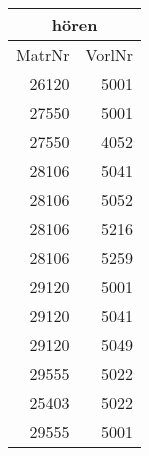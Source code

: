 \begin{tabular}[t]{|r|r|}
  \hline
  \multicolumn{2}{|c|}{hören}\\
  \hline
  MatrNr & VorlNr\\
  \hline\hline
  26120 & 5001\\
  27550 & 5001\\
  27550 & 4052\\
  28106 & 5041\\
  28106 & 5052\\
  28106 & 5216\\
  28106 & 5259\\
  29120 & 5001\\
  29120 & 5041\\
  29120 & 5049\\
  29555 & 5022\\
  25403 & 5022\\
  29555 & 5001\\
  \hline
\end{tabular}
